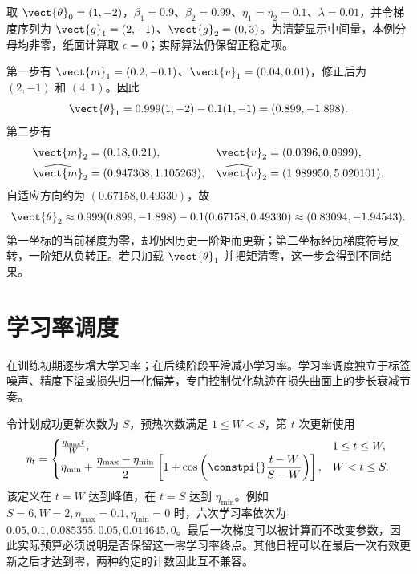 \documentclass[../textbook.tex]{subfiles}
\begin{document}
\begin{example}[两步参数更新]


取 $\vect{\theta}_0=(1,-2)$，$\beta_1=0.9$、$\beta_2=0.99$、$\eta_1=\eta_2=0.1$、$\lambda=0.01$，并令梯度序列为 $\vect{g}_1=(2,-1)$、$\vect{g}_2=(0,3)$。为清楚显示中间量，本例分母均非零，纸面计算取 $\epsilon=0$；实际算法仍保留正稳定项。

第一步有 $\vect{m}_1=(0.2,-0.1)$、$\vect{v}_1=(0.04,0.01)$，修正后为 $(2,-1)$ 和 $(4,1)$。因此
\begin{equation*}
 \vect{\theta}_1=0.999(1,-2)-0.1(1,-1)=(0.899,-1.898).
\end{equation*}
第二步有
\begin{align*}
 \vect{m}_2&=(0.18,0.21),&\vect{v}_2&=(0.0396,0.0999),\\
 \widehat{\vect{m}}_2&=(0.947368,1.105263),&
 \widehat{\vect{v}}_2&=(1.989950,5.020101).
\end{align*}
自适应方向约为 $(0.67158,0.49330)$，故
\begin{equation*}
 \vect{\theta}_2\approx0.999(0.899,-1.898)-0.1(0.67158,0.49330)
 \approx(0.83094,-1.94543).
\end{equation*}
第一坐标的当前梯度为零，却仍因历史一阶矩而更新；第二坐标经历梯度符号反转，一阶矩从负转正。若只加载 $\vect{\theta}_1$ 并把矩清零，这一步会得到不同结果。
\end{example}

\section{学习率调度}

在训练初期逐步增大学习率；在后续阶段平滑减小学习率。学习率调度独立于标签噪声、精度下溢或损失归一化偏差，专门控制优化轨迹在损失曲面上的步长衰减节奏。

令计划成功更新次数为 $S$，预热次数满足 $1\le W<S$，第 $t$ 次更新使用
\begin{equation}
 \eta_t=
 \begin{cases}
 \frac{\eta_{\max}t}{W},&1\le t\le W,\\
 \eta_{\min}+\dfrac{\eta_{\max}-\eta_{\min}}2
 \left[1+\cos\left(\constpi{}\dfrac{t-W}{S-W}\right)\right],&W<t\le S.
 \end{cases}
 \label{eq:stability-schedule}
\end{equation}
该定义在 $t=W$ 达到峰值，在 $t=S$ 达到 $\eta_{\min}$。例如 $S=6,W=2,\eta_{\max}=0.1,\eta_{\min}=0$ 时，六次学习率依次为 $0.05,0.1,0.085355,0.05,0.014645,0$。最后一次梯度可以被计算而不改变参数，因此实际预算必须说明是否保留这一零学习率终点。其他日程可以在最后一次有效更新之后才达到零，两种约定的计数因此互不兼容。
\end{document}
